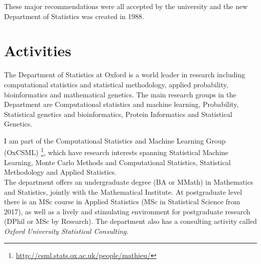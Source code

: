 These major recommendations were all accepted by the university and the new Department of Statistics was created in 1988.

\section{Activities}
\quad The Department of Statistics at Oxford is a world leader in research including computational statistics and statistical methodology, applied probability, bioinformatics and mathematical genetics.
The main research groups in the Department are Computational statistics and machine learning, Probability, Statistical genetics and bioinformatics, Protein Informatics and  Statistical Genetics.

I am part of the Computational Statistics and Machine Learning Group (OxCSML) \footnote{\url{http://csml.stats.ox.ac.uk/people/mathieu/}}, which have research interests spanning Statistical Machine Learning, Monte Carlo Methods and Computational Statistics, Statistical Methodology and Applied Statistics. \\

The department offers an undergraduate degree (BA or MMath) in Mathematics and Statistics, jointly with the Mathematical Institute. 
At postgraduate level there is an MSc course in Applied Statistics (MSc in Statistical Science from 2017), as well as a lively and stimulating environment for postgraduate research (DPhil or MSc by Research).
The department also has a consulting activity called \textit{Oxford University Statistical Consulting}.

